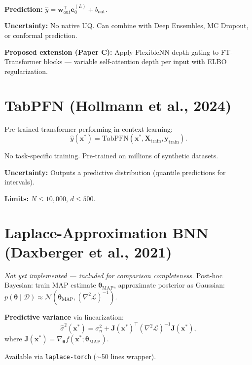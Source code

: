 \documentclass[11pt,a4paper]{article}
\theoremstyle{definition}
\newcommand{\bx}{\mathbf{x}}
\newcommand{\by}{\mathbf{y}}
\newcommand{\bw}{\mathbf{w}}
\newcommand{\bX}{\mathbf{X}}
\newcommand{\btheta}{\boldsymbol{\theta}}
\begin{document}
\textbf{Prediction:} $\hat{y} = \bw_{\mathrm{out}}^\top \mathbf{e}_0^{(L)} + b_{\mathrm{out}}$.

\textbf{Uncertainty:} No native UQ. Can combine with Deep Ensembles,
MC Dropout, or conformal prediction.

\textbf{Proposed extension (Paper C):} Apply FlexibleNN depth gating to
FT-Transformer blocks --- variable self-attention depth per input with
ELBO regularization.

\section{TabPFN (Hollmann et al., 2024)}

Pre-trained transformer performing in-context learning:
\[
  \hat{y}(\bx^*) = \mathrm{TabPFN}(\bx^*, \bX_{\mathrm{train}}, \by_{\mathrm{train}}).
\]

No task-specific training. Pre-trained on millions of synthetic datasets.

\textbf{Uncertainty:} Outputs a predictive distribution (quantile
predictions for intervals).

\textbf{Limits:} $N \leq 10{,}000$, $d \leq 500$.

\section{Laplace-Approximation BNN (Daxberger et al., 2021)}
\label{sec:laplace}

\emph{Not yet implemented --- included for comparison completeness.}
Post-hoc Bayesian: train MAP estimate $\btheta_{\mathrm{MAP}}$, approximate
posterior as Gaussian:
$p(\btheta \mid \mathcal{D}) \approx \mathcal{N}(\btheta_{\mathrm{MAP}}, (\nabla^2 \mathcal{L})^{-1})$.

\textbf{Predictive variance} via linearization:
\begin{equation}
  \hat{\sigma}^2(\bx^*) = \sigma_n^2 + \mathbf{J}(\bx^*)^\top (\nabla^2 \mathcal{L})^{-1} \mathbf{J}(\bx^*),
  \label{eq:laplace}
\end{equation}
where $\mathbf{J}(\bx^*) = \nabla_\btheta f(\bx^*; \btheta_{\mathrm{MAP}})$.

Available via \texttt{laplace-torch} ($\sim$50 lines wrapper).
\end{document}
